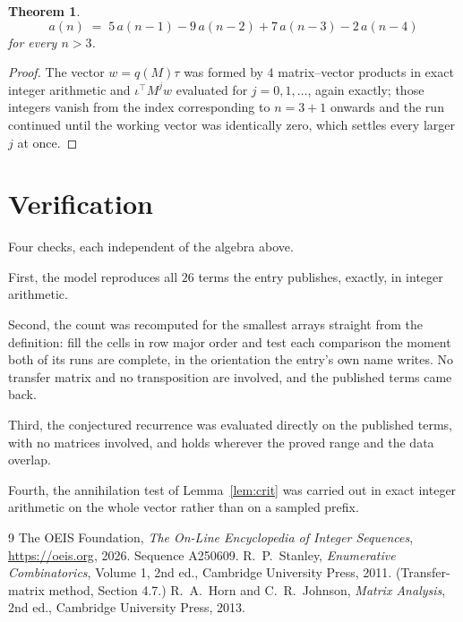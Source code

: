 \documentclass[11pt,a4paper]{article}
\theoremstyle{plain}
\newtheorem{theorem}{Theorem}
\theoremstyle{definition}
\begin{document}
\begin{theorem}
\[
a(n)\;=\;5\,a(n-1) - 9\,a(n-2) + 7\,a(n-3) - 2\,a(n-4)
\]
for every $n>3$.
\end{theorem}

\begin{proof}
The vector $w=q(M)\tau$ was formed by $4$ matrix--vector products in exact integer
arithmetic and $\iota^{\!\top}M^{j}w$ evaluated for $j=0,1,\dots$, again exactly; those
integers vanish from the index corresponding to $n=3+1$ onwards and the run continued
until the working vector was identically zero, which settles every larger $j$ at once.
\end{proof}

\section{Verification}

Four checks, each independent of the algebra above.

First, the model reproduces all $26$ terms the entry publishes, exactly, in integer
arithmetic.

Second, the count was recomputed for the smallest arrays straight from the definition: fill the
cells in row major order and test each comparison the moment both of its runs are complete,
in the orientation the entry's own name writes. No transfer matrix and no transposition are
involved, and the published terms came back.

Third, the conjectured recurrence was evaluated directly on the published terms, with no
matrices involved, and holds wherever the proved range and the data overlap.

Fourth, the annihilation test of Lemma~\ref{lem:crit} was carried out in exact integer
arithmetic on the whole vector rather than on a sampled prefix.

\begin{thebibliography}{9}
 The OEIS Foundation, \emph{The On-Line Encyclopedia of Integer
Sequences}, \url{https://oeis.org}, 2026. Sequence A250609.
 R.~P.~Stanley, \emph{Enumerative Combinatorics}, Volume 1, 2nd ed.,
Cambridge University Press, 2011. (Transfer-matrix method, Section 4.7.)
 R.~A.~Horn and C.~R.~Johnson, \emph{Matrix Analysis}, 2nd ed., Cambridge
University Press, 2013.
\end{thebibliography}
\end{document}
